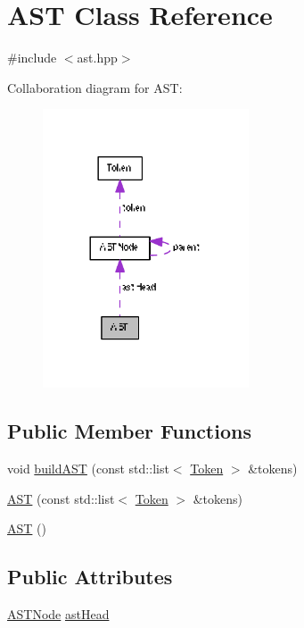 \hypertarget{class_a_s_t}{}\section{A\+S\+T Class Reference}
\label{class_a_s_t}


{\ttfamily \#include $<$ast.\+hpp$>$}



Collaboration diagram for A\+S\+T\+:\nopagebreak
\begin{figure}[H]
\begin{center}
\leavevmode
\includegraphics[width=173pt]{class_a_s_t__coll__graph}
\end{center}
\end{figure}
\subsection*{Public Member Functions}
\begin{DoxyCompactItemize}
\item 
void \hyperlink{class_a_s_t_a8fe6207ce46b87c2febdc6ebdf0be6dd}{build\+A\+S\+T} (const std\+::list$<$ \hyperlink{struct_token}{Token} $>$ \&tokens)
\item 
\hyperlink{class_a_s_t_a2daa6c636071ad4e888897a93e3dd380}{A\+S\+T} (const std\+::list$<$ \hyperlink{struct_token}{Token} $>$ \&tokens)
\item 
\hyperlink{class_a_s_t_afd378ca7cb3049d6293e8597d31d758d}{A\+S\+T} ()
\end{DoxyCompactItemize}
\subsection*{Public Attributes}
\begin{DoxyCompactItemize}
\item 
\hyperlink{struct_a_s_t_node}{A\+S\+T\+Node} \hyperlink{class_a_s_t_aaa30ec872fa91242f5c9cb7a5041b307}{ast\+Head}
\end{DoxyCompactItemize}
